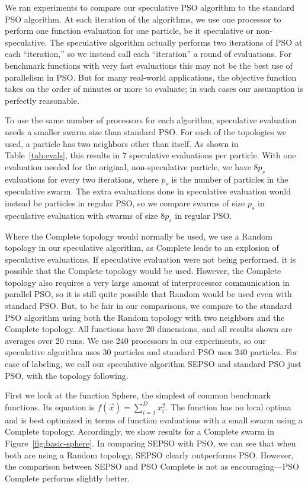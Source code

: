 \documentclass[journal,letterpaper]{IEEEtran}
\newcommand{\fig}[1]{Figure~\ref{fig:#1}}
\begin{document}
We ran experiments to compare our speculative PSO algorithm to the standard
PSO algorithm.  At each iteration of the algorithms, we use one processor to
perform one function evaluation for one particle, be it speculative or
non-speculative.  The speculative algorithm actually performs two iterations of
PSO at each ``iteration,'' so we instead call each ``iteration'' a round of
evaluations.  For benchmark functions with very fast evaluations this may not
be the best use of parallelism in PSO.  But for many real-world applications,
the objective function takes on the order of minutes or more to evaluate; in
such cases our assumption is perfectly reasonable.

To use the same number of processors for each algorithm, speculative evaluation
needs a smaller swarm size than standard PSO.  For each of the topologies we
used, a particle has two neighbors other than itself.  As shown in
Table~\ref{tab:evals}, this results in $7$ speculative evaluations per
particle.  With one evaluation needed for the original, non-speculative
particle, we have $8p_s$ evaluations for every two iterations, where $p_s$ is
the number of particles in the speculative swarm.  The extra evaluations done
in speculative evaluation would instead be particles in regular PSO, so we
compare swarms of size $p_s$ in speculative evaluation with swarms of size
$8p_s$ in regular PSO.

Where the Complete topology would normally be used, we use a Random topology in
our speculative algorithm, as Complete leads to an explosion of speculative
evaluations.  If speculative evaluation were not being performed, it is
possible that the Complete topology would be used.  However, the Complete
topology also requires a very large amount of interprocessor communication in
parallel PSO, so it is still quite possible that Random would be used even with
standard PSO.  But, to be fair in our comparisons, we compare to the standard
PSO algorithm using both the Random topology with two neighbors and the
Complete topology.  All functions have 20 dimensions, and all results shown are
averages over 20 runs.  We use 240 processors in our experiments, so our
speculative algorithm uses 30 particles and standard PSO uses 240 particles.
For ease of labeling, we call our speculative algorithm SEPSO and standard PSO
just PSO, with the topology following.

First we look at the function Sphere, the simplest of common benchmark
functions.  Its equation is $f(\Vec{x}) = \sum_{i=1}^D x_i^2$.  The function
has no local optima and is best optimized in terms of function evaluations with
a small swarm using a Complete topology.  Accordingly, we show results for a
Complete swarm in \fig{basic-sphere}.  In comparing SEPSO with PSO, we can see
that when both are using a Random topology, SEPSO clearly outperforms PSO.
However, the comparison between SEPSO and PSO Complete is not as
encouraging---PSO Complete performs slightly better.
\end{document}
